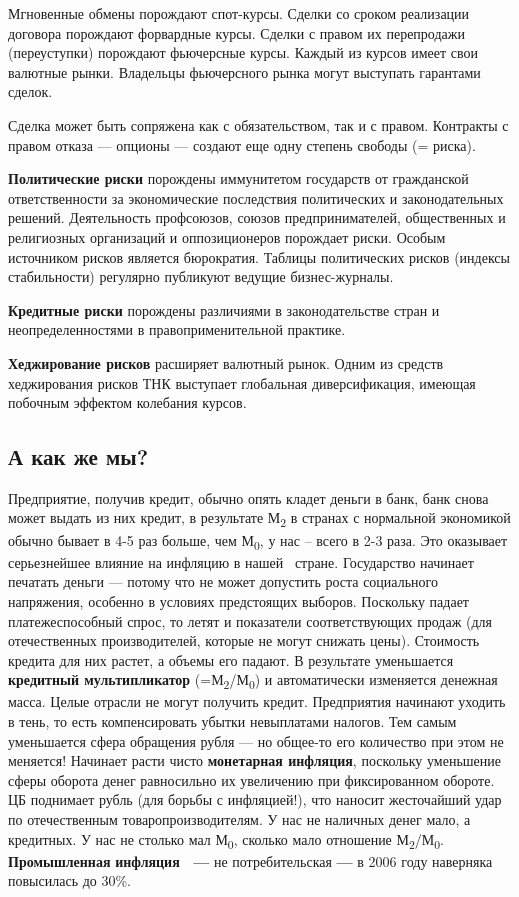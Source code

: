 Мгновенные обмены порождают спот-курсы. Сделки со сроком реализации договора порождают форвардные курсы. Сделки с правом
их перепродажи (переуступки) порождают фьючерсные курсы. Каждый из курсов имеет свои валютные рынки. Владельцы
фьючерсного рынка могут выступать гарантами сделок.


Сделка может быть сопряжена как с обязательством, так и с правом. Контракты с правом отказа — опционы — создают еще одну
степень свободы (= риска).


\textbf{Политические риски} порождены иммунитетом государств от гражданской ответственности за экономические последствия
политических и законодательных решений. Деятельность профсоюзов, союзов предпринимателей, общественных и религиозных
организаций и оппозиционеров порождает риски. Особым источником рисков является бюрократия. Таблицы политических рисков
(индексы стабильности) регулярно публикуют ведущие бизнес-журналы.


\textbf{Кредитные риски} порождены различиями в законодательстве стран и неопределенностями в правоприменительной
практике.


\textbf{Хеджирование рисков} расширяет валютный рынок. Одним из средств хеджирования рисков ТНК выступает глобальная
диверсификация, имеющая побочным эффектом колебания курсов.

\subsection{А как же мы?}

Предприятие, получив кредит, обычно опять кладет деньги в банк, банк снова может выдать из них кредит, в результате
М\textsubscript{2} в странах с нормальной экономикой обычно бывает в 4-5 раз больше, чем М\textsubscript{0}, у нас –
всего в 2-3 раза. Это оказывает серьезнейшее влияние на инфляцию в нашей \ стране. Государство начинает печатать деньги
— потому что не может допустить роста социального напряжения, особенно в условиях предстоящих выборов. Поскольку падает
платежеспособный спрос, то летят и показатели соответствующих продаж (для отечественных производителей, которые не
могут снижать цены). Стоимость кредита для них растет, а объемы его падают. В результате уменьшается \textbf{кредитный
мультипликатор }(=М\textsubscript{2}/М\textsubscript{0}) и автоматически изменяется денежная масса. Целые отрасли не
могут получить кредит. Предприятия начинают уходить в тень, то есть компенсировать убытки невыплатами налогов. Тем
самым уменьшается сфера обращения рубля — но общее-то его количество при этом не меняется! Начинает расти чисто
\textbf{монетарная инфляция}, поскольку уменьшение сферы оборота денег равносильно их увеличению при фиксированном
обороте. ЦБ поднимает рубль (для борьбы с инфляцией!), что наносит жесточайший удар по отечественным
товаропроизводителям. У нас не наличных денег мало, а кредитных. У нас не столько мал М\textsubscript{0}, сколько мало
отношение М\textsubscript{2}/М\textsubscript{0}. \textbf{Промышленная} \textbf{инфляция \ — }не потребительская\textbf{
— }в 2006 году\textbf{ }наверняка\textbf{ }повысилась до 30\%.
%
